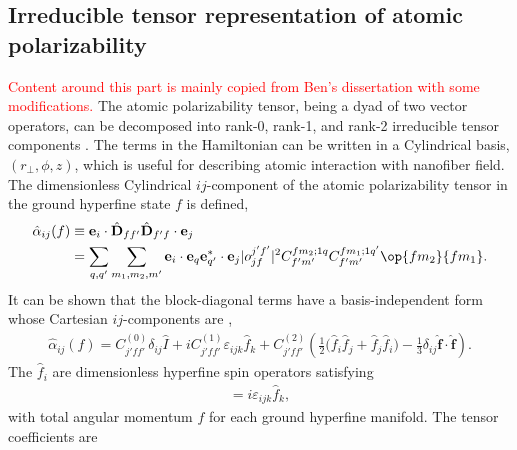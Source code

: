 \documentclass[]{report}
\begin{document}
\subsection{Irreducible tensor representation of atomic polarizability}
\textcolor{red}{Content around this part is mainly copied from Ben's dissertation with some modifications.}
The atomic polarizability tensor, being a dyad of two vector operators, can be decomposed into rank-0, rank-1, and rank-2 irreducible tensor components \cite{Stockton2007, Hammerer2006, Geremia2006, Deutsch2010a, LeKien2013}.  The terms in the Hamiltonian can be written in a Cylindrical basis, $ (r\!_\perp,\phi,z) $, which is useful for describing atomic interaction with nanofiber field. The dimensionless Cylindrical $ij$-component of the atomic polarizability tensor in the ground hyperfine state $f$ is defined,
\begin{align} \label{Eq::alphaij}
\hat{\alpha}_{ij}(f) &\equiv \mathbf{e}_i \cdot \hat{\mathbf{D}}_{f f'} \hat{\mathbf{D}}_{f' f} \cdot \mathbf{e}_j\\
&= \sum_{q,q'} \sum_{m_1, m_2, m'} \mathbf{e}_i \cdot\mathbf{e}_q \mathbf{e}^*_{q'}\cdot \mathbf{e}_j | o^{j'f'}_{jf} |^2 C^{fm_2;1q}_{f'm'} C^{fm_1;1q'}_{f'm'} \op{f m_2}{f m_1}.
\end{align}	
It can be shown that the block-diagonal terms have a basis-independent form whose Cartesian $ij$-components are \cite{Deutsch2010a},
	\begin{align} \label{Eq::IrreducibleDecomp}
		\hat{\alpha}_{ij} (f) = C_{j' f f'}^{(0)} \delta_{ij} \hat{ I } + i C_{j' f f'}^{(1)} \varepsilon_{ijk} \hat{f}_k + C_{j' f f'}^{(2)} \left(\frac{1}{2} \big(\hat{f}_i \hat{f}_j + \hat{f}_j \hat{f}_i \big) - \frac{1}{3} \delta_{ij} \hat{ \mathbf{f} } \cdot \hat{ \mathbf{f} }  \right).  
	\end{align}
The $\hat{f}_i$ are dimensionless hyperfine spin operators satisfying
	\begin{align}
		[\hat{f}_i, \hat{f}_j] = i \varepsilon_{ijk} \hat{f}_k,
	\end{align}
with total angular momentum $f$ for each ground hyperfine manifold.  The tensor coefficients are~\cite{Deutsch2010a}
\end{document}
